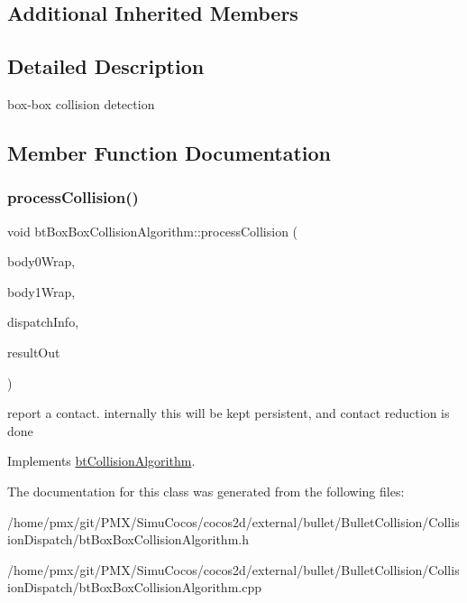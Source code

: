 \subsection*{Additional Inherited Members}


\subsection{Detailed Description}
box-\/box collision detection 

\subsection{Member Function Documentation}
\mbox{\label{classbtBoxBoxCollisionAlgorithm_aadde989098617a7679a8d907f4144adb}} 
\subsubsection{\texorpdfstring{process\+Collision()}{processCollision()}}
{\footnotesize\ttfamily void bt\+Box\+Box\+Collision\+Algorithm\+::process\+Collision (\begin{DoxyParamCaption}\item[{const \hyperlink{structbtCollisionObjectWrapper}{bt\+Collision\+Object\+Wrapper} $\ast$}]{body0\+Wrap,  }\item[{const \hyperlink{structbtCollisionObjectWrapper}{bt\+Collision\+Object\+Wrapper} $\ast$}]{body1\+Wrap,  }\item[{const \hyperlink{structbtDispatcherInfo}{bt\+Dispatcher\+Info} \&}]{dispatch\+Info,  }\item[{\hyperlink{classbtManifoldResult}{bt\+Manifold\+Result} $\ast$}]{result\+Out }\end{DoxyParamCaption})\hspace{0.3cm}{\ttfamily [virtual]}}

report a contact. internally this will be kept persistent, and contact reduction is done 

Implements \hyperlink{classbtCollisionAlgorithm}{bt\+Collision\+Algorithm}.



The documentation for this class was generated from the following files\+:\begin{DoxyCompactItemize}
\item 
/home/pmx/git/\+P\+M\+X/\+Simu\+Cocos/cocos2d/external/bullet/\+Bullet\+Collision/\+Collision\+Dispatch/bt\+Box\+Box\+Collision\+Algorithm.\+h\item 
/home/pmx/git/\+P\+M\+X/\+Simu\+Cocos/cocos2d/external/bullet/\+Bullet\+Collision/\+Collision\+Dispatch/bt\+Box\+Box\+Collision\+Algorithm.\+cpp\end{DoxyCompactItemize}
